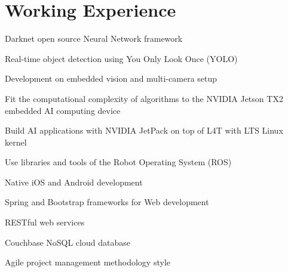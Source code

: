 \documentclass[]{resume}
\begin{document}
\begin{minipage}[t]{0.66\textwidth} 	
\section{Working Experience}

 
	\vspace{\topsep} %
	\begin{tightemize}

	\item Darknet open source Neural Network framework
	\item Real-time object detection using You Only Look Once (YOLO)
	\item Development on embedded vision and multi-camera setup
	\item Fit the computational complexity of algorithms to the NVIDIA Jetson TX2 embedded AI computing device
	\item Build AI applications with NVIDIA JetPack on top of L4T with LTS Linux kernel
	\item Use libraries and tools of the Robot Operating System (ROS)

	\end{tightemize}
	\sectionsep

 
	\begin{tightemize}

	\item Native iOS and Android development
	\item Spring and Bootstrap frameworks for Web development
	\item RESTful web services
	\item Couchbase NoSQL cloud database
	\item Agile project management methodology style

	\end{tightemize}
	\sectionsep


\end{minipage}
\end{document}
